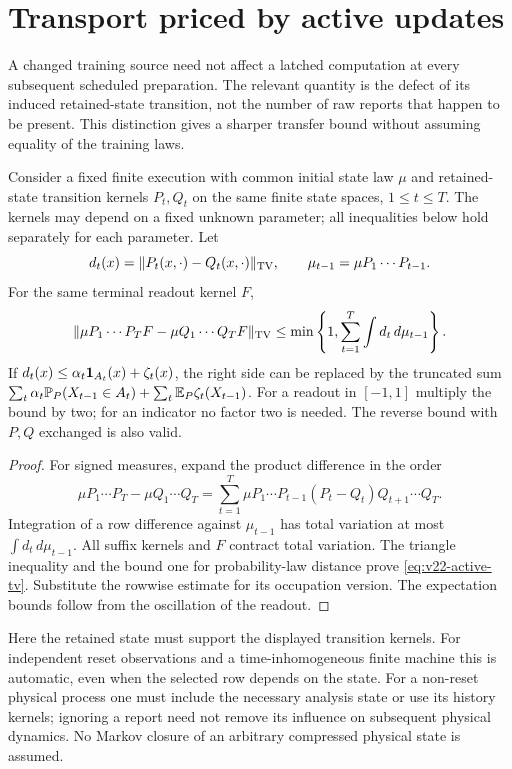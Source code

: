 \section{Transport priced by active updates}
\label{sec:v22-active}
A changed training source need not affect a latched computation at every
subsequent scheduled preparation. The relevant quantity is the defect
of its induced retained-state transition, not the number of raw reports
that happen to be present. This distinction gives a sharper transfer
bound without assuming equality of the training laws.

\begin{theorem}
\label{thm:v22-active}
Consider a fixed finite execution with common initial state law $\mu$
and retained-state transition kernels $P_t,Q_t$ on the same finite state
spaces, $1\le t\le T$. The kernels may depend on a fixed unknown
parameter; all inequalities below hold separately for each parameter.
Let
\[
 d_t(x)=\|P_t(x,\cdot)-Q_t(x,\cdot)\|_{\mathrm{TV}},\qquad
 \mu_{t-1}=\mu P_1\cdots P_{t-1}.
\]
For the same terminal readout kernel $F$,
\begin{equation}\label{eq:v22-active-tv}
 \|\mu P_1\cdots P_TF-\mu Q_1\cdots Q_TF\|_{\mathrm{TV}}
 \le\min\left\{1,\sum_{t=1}^T\int d_t\,d\mu_{t-1}\right\}.
\end{equation}
If $d_t(x)\le\alpha_t\mathbf 1_{A_t}(x)+\zeta_t(x)$, the right side can be
replaced by the truncated sum
$\sum_t\alpha_t\mathbb P_P(X_{t-1}\in A_t)+\sum_t\mathbb E_P\zeta_t(X_{t-1})$.
For a readout in $[-1,1]$ multiply the bound by two; for an indicator
no factor two is needed. The reverse bound with $P,Q$ exchanged is
also valid.
\end{theorem}
\begin{proof}
For signed measures, expand the product difference in the order
\[
 \mu P_1\cdots P_T-\mu Q_1\cdots Q_T
 =\sum_{t=1}^T\mu P_1\cdots P_{t-1}(P_t-Q_t)Q_{t+1}\cdots Q_T.
\]
Integration of a row difference against $\mu_{t-1}$ has total
variation at most $\int d_t\,d\mu_{t-1}$. All suffix kernels and $F$
contract total variation. The triangle inequality and the bound one
for probability-law distance prove \eqref{eq:v22-active-tv}.
Substitute the rowwise estimate for its occupation version. The
expectation bounds follow from the oscillation of the readout.
\end{proof}

Here the retained state must support the displayed transition kernels.
For independent reset observations and a time-inhomogeneous finite
machine this is automatic, even when the selected row depends on the
state. For a non-reset physical process one must include the necessary
analysis state or use its history kernels; ignoring a report need not
remove its influence on subsequent physical dynamics. No Markov
closure of an arbitrary compressed physical state is assumed.

